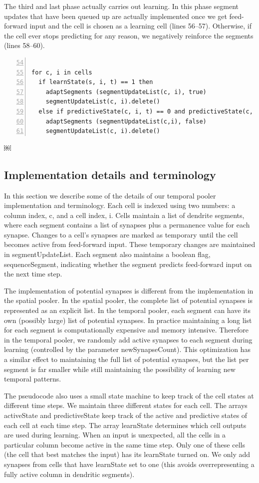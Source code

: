 \documentclass{report}
\begin{document}
The third and last phase actually carries out learning. In this phase
segment updates that have been queued up are actually implemented once
we get feed-forward input and the cell is chosen as a learning cell
(lines 56--57). Otherwise, if the cell ever stops predicting for any
reason, we negatively reinforce the segments (lines 58--60).

\begin{lstlisting}[numbers=left,firstnumber=54]￼
for c, i in cells
  if learnState(s, i, t) == 1 then
    adaptSegments (segmentUpdateList(c, i), true)
    segmentUpdateList(c, i).delete()
  else if predictiveState(c, i, t) == 0 and predictiveState(c, i, t-1)==1 then
    adaptSegments (segmentUpdateList(c,i), false)
    segmentUpdateList(c, i).delete()
\end{lstlisting}￼

\subsection*{Implementation details and terminology}
In this section we describe some of the details of our temporal pooler
implementation and terminology. Each cell is indexed using two
numbers: a column index, c, and a cell index, i. Cells maintain a list
of dendrite segments, where each segment contains a list of synapses
plus a permanence value for each synapse. Changes to a cell's synapses
are marked as temporary until the cell becomes active from
feed-forward input. These temporary changes are maintained in
segmentUpdateList. Each segment also maintains a boolean flag,
sequenceSegment, indicating whether the segment predicts feed-forward
input on the next time step.

The implementation of potential synapses is different from the
implementation in the spatial pooler. In the spatial pooler, the
complete list of potential synapses is represented as an explicit
list. In the temporal pooler, each segment can have its own (possibly
large) list of potential synapses. In practice maintaining a long list
for each segment is computationally expensive and memory
intensive. Therefore in the temporal pooler, we randomly add active
synapses to each segment during learning (controlled by the parameter
newSynapseCount). This optimization has a similar effect to
maintaining the full list of potential synapses, but the list per
segment is far smaller while still maintaining the possibility of
learning new temporal patterns.

The pseudocode also uses a small state machine to keep track of the
cell states at different time steps. We maintain three different
states for each cell. The arrays activeState and predictiveState keep
track of the active and predictive states of each cell at each time
step. The array learnState determines which cell outputs are used
during learning. When an input is unexpected, all the cells in a
particular column become active in the same time step. Only one of
these cells (the cell that best matches the input) has its learnState
turned on. We only add synapses from cells that have learnState set to
one (this avoids overrepresenting a fully active column in dendritic
segments).
\end{document}
